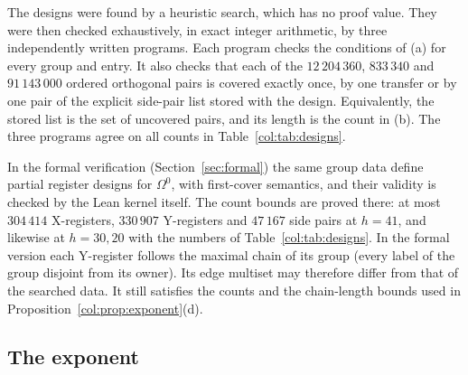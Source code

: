 \begin{remark}\label{col:rem:designs}
The designs were found by a heuristic search, which has no proof value. They were then checked
exhaustively, in exact integer arithmetic, by three independently written programs. Each program
checks the
conditions of (a) for every group and entry. It also checks that each of the $12\,204\,360$,
$833\,340$ and $91\,143\,000$ ordered orthogonal pairs is covered exactly once, by one transfer or by
one pair of the explicit side-pair list stored with the design. Equivalently, the stored list is the
set of uncovered pairs, and its length is the count in (b). The three programs agree on all counts in
Table~\ref{col:tab:designs}.

In the formal verification (Section~\ref{sec:formal}) the same group data define partial register
designs for $\Omega^0$, with first-cover semantics, and their validity is checked by the Lean kernel
itself. The count bounds are proved there: at most $304\,414$ X-registers, $330\,907$ Y-registers and
$47\,167$ side pairs at $h=41$, and likewise at $h=30,20$ with the numbers of
Table~\ref{col:tab:designs}. In the formal version each Y-register follows the maximal chain of its
group (every label of the group disjoint from its owner). Its edge multiset may therefore differ from
that of the searched data. It still satisfies the counts and the chain-length bounds used in
Proposition~\ref{col:prop:exponent}(d).
\end{remark}

\subsection{The exponent}\label{col:sec:exponent}

